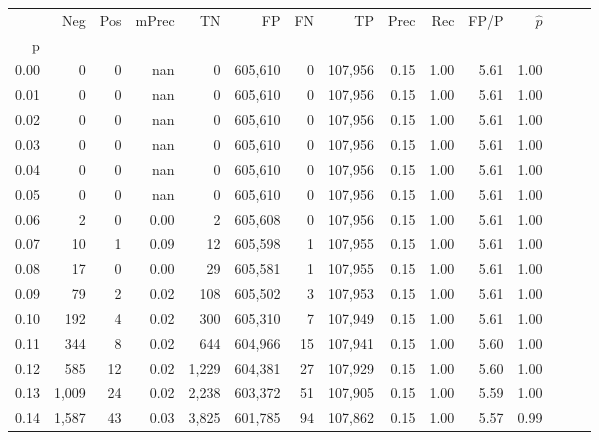 \begin{tabular}{rrrrrrrrrrrrrrr}
\toprule
{} &     Neg &    Pos & mPrec &       TN &       FP &       FN &       TP &  Prec &   Rec &  FP/P & $\hat{p}$ \\
p    &         &        &       &          &          &          &          &       &       &       &           \\
\midrule
0.00 &       0 &      0 &   nan &        0 &  605,610 &        0 &  107,956 &  0.15 &  1.00 &  5.61 &      1.00 \\
0.01 &       0 &      0 &   nan &        0 &  605,610 &        0 &  107,956 &  0.15 &  1.00 &  5.61 &      1.00 \\
0.02 &       0 &      0 &   nan &        0 &  605,610 &        0 &  107,956 &  0.15 &  1.00 &  5.61 &      1.00 \\
0.03 &       0 &      0 &   nan &        0 &  605,610 &        0 &  107,956 &  0.15 &  1.00 &  5.61 &      1.00 \\
0.04 &       0 &      0 &   nan &        0 &  605,610 &        0 &  107,956 &  0.15 &  1.00 &  5.61 &      1.00 \\
0.05 &       0 &      0 &   nan &        0 &  605,610 &        0 &  107,956 &  0.15 &  1.00 &  5.61 &      1.00 \\
0.06 &       2 &      0 &  0.00 &        2 &  605,608 &        0 &  107,956 &  0.15 &  1.00 &  5.61 &      1.00 \\
0.07 &      10 &      1 &  0.09 &       12 &  605,598 &        1 &  107,955 &  0.15 &  1.00 &  5.61 &      1.00 \\
0.08 &      17 &      0 &  0.00 &       29 &  605,581 &        1 &  107,955 &  0.15 &  1.00 &  5.61 &      1.00 \\
0.09 &      79 &      2 &  0.02 &      108 &  605,502 &        3 &  107,953 &  0.15 &  1.00 &  5.61 &      1.00 \\
0.10 &     192 &      4 &  0.02 &      300 &  605,310 &        7 &  107,949 &  0.15 &  1.00 &  5.61 &      1.00 \\
0.11 &     344 &      8 &  0.02 &      644 &  604,966 &       15 &  107,941 &  0.15 &  1.00 &  5.60 &      1.00 \\
0.12 &     585 &     12 &  0.02 &    1,229 &  604,381 &       27 &  107,929 &  0.15 &  1.00 &  5.60 &      1.00 \\
0.13 &   1,009 &     24 &  0.02 &    2,238 &  603,372 &       51 &  107,905 &  0.15 &  1.00 &  5.59 &      1.00 \\
0.14 &   1,587 &     43 &  0.03 &    3,825 &  601,785 &       94 &  107,862 &  0.15 &  1.00 &  5.57 &      0.99 \\

\end{tabular}
